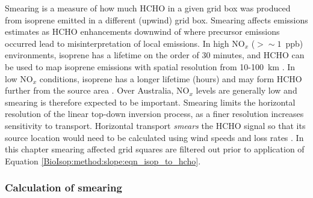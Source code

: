     Smearing is a measure of how much HCHO in a given grid box was produced from isoprene emitted in a different (upwind) grid box.
    Smearing affects emissions estimates as HCHO enhancements downwind of where precursor emissions occurred lead to misinterpretation of local emissions.
    In high NO$_x$ ($ > \sim 1 $~ppb) environments, isoprene has a lifetime on the order of 30 minutes, and HCHO can be used to map isoprene emissions with spatial resolution from 10-100~km \parencite{Palmer2003}.
    In low NO$_x$ conditions, isoprene has a longer lifetime (hours) and may form HCHO further from the source area \parencite{Fan2004,Liu2016a,Liu2017_hpald}.
    Over Australia, NO$_x$ levels are generally low and smearing is therefore expected to be important.
    Smearing limits the horizontal resolution of the linear top-down inversion process, as a finer resolution increases sensitivity to transport.
    Horizontal transport \textit{smears} the HCHO signal so that its source location would need to be calculated using wind speeds and loss rates \parencite{Palmer2001,Palmer2003}.
    In this chapter smearing affected grid squares are filtered out prior to application of Equation \ref{BioIsop:method:slope:eqn_isop_to_hcho}.
    
    
    \subsubsection{Calculation of smearing}
    \label{Model:filter:smearing:calculation}
    

